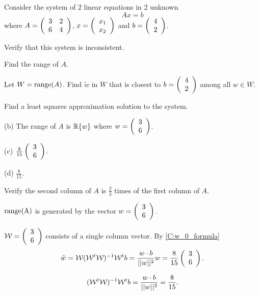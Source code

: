 \documentclass{ximera}
\begin{document}
\begin{exercise} \label{YZ_9.1.12}
Consider the system of 2 linear equations in 2 unknown
\[
Ax=b
\]
where 
$A=\left(\begin{array}{rrrrrrrrrrrrrrrrrr} 3&2\\6&4 \end{array}\right)$, $x=\left(\begin{array}{rrrrrrrrrrrrrrrrrr} x_1\\x_2 \end{array}\right)$ and $b=\left(\begin{array}{rrrrrrrrrrrrrrrrrr} 4\\2 \end{array}\right)$.

\begin{enumeratea}
	\item Verify that this system is inconsistent.
    \item Find the range of $A$.
    \item Let $W=\textup{range}(A)$. Find $\tilde{w}$ in $W$ that is closest to $b=\left(\begin{array}{rrrrrrrrrrrrrrrrrr} 4\\2 \end{array}\right)$ among all $w\in W$.
    \item Find a least squares approximation solution to the system.
\end{enumeratea}
\begin{solution}
\ans  \begin{enumeratea}
 
   
    \item[(b)] The range of $A$ is $\mbox{$\mathbb{R}$}\{w\}$ where $w=\left(\begin{array}{rrrrrrrrrrrrrrrrrr} 3\\6 \end{array}\right)$.
    
     \item[(c)] $\frac{8}{15}\left(\begin{array}{rrrrrrrrrrrrrrrrrr} 3\\6 \end{array}\right)$.

    \item[(d)] $\frac{8}{15}$.
\end{enumeratea}


\soln

\begin{enumeratea}
    \item Verify the second column of $A$ is $\frac23$ times of the first column of $A$.
    \item $\textup{range(A)}$ is generated by the vector $w=\left(\begin{array}{rrrrrrrrrrrrrrrrrr} 3\\6 \end{array}\right)$. 
    \item $\mathcal{W}=\left(\begin{array}{rrrrrrrrrrrrrrrrrr} 3\\6 \end{array}\right)$ consists of a single column vector. By \eqref{C:w_0_formula} 
\[
\tilde{w}=\mathcal{W}(\mathcal{W}^t\mathcal{W})^{-1}\mathcal{W}^tb=\frac{w\cdot b}{||w||^2}w=\frac{8}{15}\left(\begin{array}{rrrrrrrrrrrrrrrrrr} 3\\6 \end{array}\right).
\]
\item 

\[
(\mathcal{W}^t\mathcal{W})^{-1}\mathcal{W}^tb=\frac{w\cdot b}{||w||^2}=\frac{8}{15}.
\]
\end{enumeratea}
\end{solution}
\end{exercise}
\end{document}
